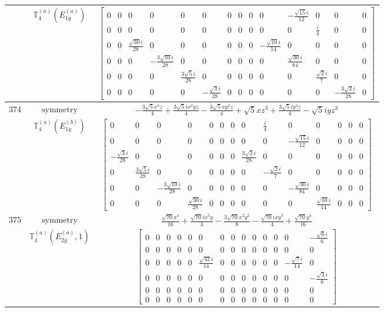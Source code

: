 \documentclass[fleqn,8pt,landscape]{jsarticle}
\begin{document}
\begin{longtable}{ccc}
$  $ & $ \mathbb{T}_{4}^{(a)}(E_{1g}^{(a)}) $ & $ \begin{bmatrix} 0 & 0 & 0 & 0 & 0 & 0 & 0 & 0 & 0 & 0 & - \frac{\sqrt{15} i}{12} & 0 & 0 & 0 \\ 0 & 0 & 0 & 0 & 0 & 0 & 0 & 0 & 0 & 0 & 0 & \frac{i}{4} & 0 & 0 \\ 0 & 0 & \frac{\sqrt{30} i}{28} & 0 & 0 & 0 & 0 & 0 & 0 & - \frac{\sqrt{10} i}{14} & 0 & 0 & 0 & 0 \\ 0 & 0 & 0 & - \frac{3 \sqrt{10} i}{28} & 0 & 0 & 0 & 0 & 0 & 0 & \frac{\sqrt{30} i}{84} & 0 & 0 & 0 \\ 0 & 0 & 0 & 0 & \frac{3 \sqrt{5} i}{28} & 0 & 0 & 0 & 0 & 0 & 0 & \frac{\sqrt{2} i}{7} & 0 & 0 \\ 0 & 0 & 0 & 0 & 0 & - \frac{\sqrt{3} i}{28} & 0 & 0 & 0 & 0 & 0 & 0 & - \frac{3 \sqrt{2} i}{28} & 0 \end{bmatrix} $ \\ \hline
$ 374 $ & $ \text{symmetry} $ & $ - \frac{3 \sqrt{5} x^{3} z}{4} + \frac{3 \sqrt{5} i x^{2} y z}{4} - \frac{3 \sqrt{5} x y^{2} z}{4} + \sqrt{5} x z^{3} + \frac{3 \sqrt{5} i y^{3} z}{4} - \sqrt{5} i y z^{3} $ \\
$  $ & $ \mathbb{T}_{4}^{(a)}(E_{1g}^{(b)}) $ & $ \begin{bmatrix} 0 & 0 & 0 & 0 & 0 & 0 & 0 & 0 & \frac{i}{4} & 0 & 0 & 0 & 0 & 0 \\ 0 & 0 & 0 & 0 & 0 & 0 & 0 & 0 & 0 & - \frac{\sqrt{15} i}{12} & 0 & 0 & 0 & 0 \\ - \frac{\sqrt{3} i}{28} & 0 & 0 & 0 & 0 & 0 & 0 & \frac{3 \sqrt{2} i}{28} & 0 & 0 & 0 & 0 & 0 & 0 \\ 0 & \frac{3 \sqrt{5} i}{28} & 0 & 0 & 0 & 0 & 0 & 0 & - \frac{\sqrt{2} i}{7} & 0 & 0 & 0 & 0 & 0 \\ 0 & 0 & - \frac{3 \sqrt{10} i}{28} & 0 & 0 & 0 & 0 & 0 & 0 & - \frac{\sqrt{30} i}{84} & 0 & 0 & 0 & 0 \\ 0 & 0 & 0 & \frac{\sqrt{30} i}{28} & 0 & 0 & 0 & 0 & 0 & 0 & \frac{\sqrt{10} i}{14} & 0 & 0 & 0 \end{bmatrix} $ \\ \hline
$ 375 $ & $ \text{symmetry} $ & $ \frac{\sqrt{70} x^{4}}{16} + \frac{\sqrt{70} i x^{3} y}{4} - \frac{3 \sqrt{70} x^{2} y^{2}}{8} - \frac{\sqrt{70} i x y^{3}}{4} + \frac{\sqrt{70} y^{4}}{16} $ \\
$  $ & $ \mathbb{T}_{4}^{(a)}(E_{2g}^{(a)},1) $ & $ \begin{bmatrix} 0 & 0 & 0 & 0 & 0 & 0 & 0 & 0 & 0 & 0 & 0 & 0 & 0 & - \frac{\sqrt{6} i}{6} \\ 0 & 0 & 0 & 0 & 0 & 0 & 0 & 0 & 0 & 0 & 0 & 0 & 0 & 0 \\ 0 & 0 & 0 & 0 & 0 & \frac{\sqrt{42} i}{14} & 0 & 0 & 0 & 0 & 0 & 0 & - \frac{\sqrt{7} i}{14} & 0 \\ 0 & 0 & 0 & 0 & 0 & 0 & 0 & 0 & 0 & 0 & 0 & 0 & 0 & - \frac{\sqrt{3} i}{6} \\ 0 & 0 & 0 & 0 & 0 & 0 & 0 & 0 & 0 & 0 & 0 & 0 & 0 & 0 \\ 0 & 0 & 0 & 0 & 0 & 0 & 0 & 0 & 0 & 0 & 0 & 0 & 0 & 0 \end{bmatrix} $ \\ \hline

\end{longtable}
\end{document}
